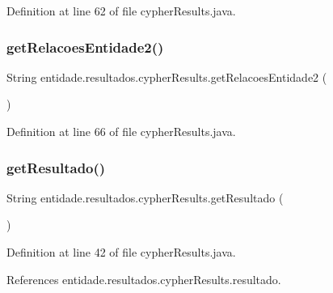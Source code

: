 Definition at line 62 of file cypher\+Results.\+java.

\hypertarget{classentidade_1_1resultados_1_1cypherResults_a5d5b2eac46cb5c6defe26610f8a7b7cf}{}\label{classentidade_1_1resultados_1_1cypherResults_a5d5b2eac46cb5c6defe26610f8a7b7cf} 
\subsubsection{\texorpdfstring{get\+Relacoes\+Entidade2()}{getRelacoesEntidade2()}}
{\footnotesize\ttfamily String entidade.\+resultados.\+cypher\+Results.\+get\+Relacoes\+Entidade2 (\begin{DoxyParamCaption}{ }\end{DoxyParamCaption})}



Definition at line 66 of file cypher\+Results.\+java.

\hypertarget{classentidade_1_1resultados_1_1cypherResults_a4fb71afa8fcecc6a5f34a81dc9457514}{}\label{classentidade_1_1resultados_1_1cypherResults_a4fb71afa8fcecc6a5f34a81dc9457514} 
\subsubsection{\texorpdfstring{get\+Resultado()}{getResultado()}}
{\footnotesize\ttfamily String entidade.\+resultados.\+cypher\+Results.\+get\+Resultado (\begin{DoxyParamCaption}{ }\end{DoxyParamCaption})}



Definition at line 42 of file cypher\+Results.\+java.



References entidade.\+resultados.\+cypher\+Results.\+resultado.

\hypertarget{classentidade_1_1resultados_1_1cypherResults_a9555f9aab56a0a1c42cce96da183dc01}{}\label{classentidade_1_1resultados_1_1cypherResults_a9555f9aab56a0a1c42cce96da183dc01} 
